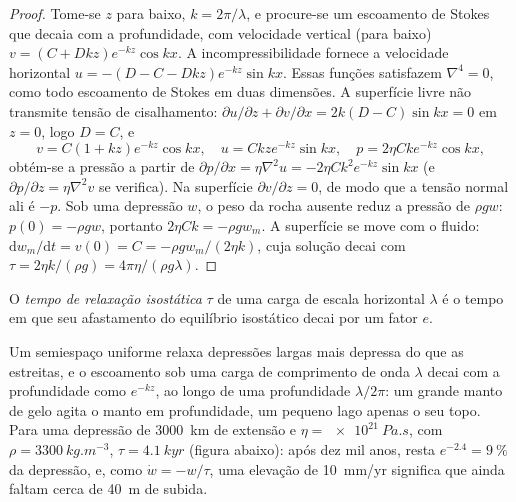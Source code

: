 \begin{proof}
Tome-se $z$ para baixo, $k = 2\pi/\lambda$, e procure-se um escoamento de Stokes que decaia
com a profundidade, com velocidade vertical (para baixo) $v = (C + Dkz)e^{-kz}\cos kx$.
A incompressibilidade fornece a velocidade horizontal $u = -(D - C - Dkz)e^{-kz}\sin
kx$. Essas funções satisfazem $\nabla^4 = 0$, como todo escoamento de Stokes em duas
dimensões. A superfície livre não transmite tensão de cisalhamento: $\partial u/\partial
z + \partial v/\partial x = 2k(D - C)\sin kx = 0$ em $z = 0$, logo $D = C$, e
\[
  v = C(1 + kz)e^{-kz}\cos kx,\quad u = Ckze^{-kz}\sin kx,\quad
  p = 2\eta Cke^{-kz}\cos kx,
\]
obtém-se a pressão a partir de $\partial p/\partial x = \eta\nabla^2u = -2\eta
Ck^2e^{-kz}\sin kx$ (e $\partial p/\partial z = \eta\nabla^2v$ se verifica). Na
superfície $\partial v/\partial z = 0$, de modo que a tensão normal ali é $-p$. Sob
uma depressão $w$, o peso da rocha ausente reduz a pressão de $\rho
gw$: $p(0) = -\rho gw$, portanto $2\eta Ck = -\rho gw_m$. A superfície se move com o
fluido: $\mathrm dw_m/\mathrm dt = v(0) = C = -\rho gw_m/(2\eta k)$, cuja
solução decai com $\tau = 2\eta k/(\rho g) = 4\pi\eta/(\rho g\lambda)$.
\end{proof}

\begin{definition}\label{def:b3:mantle-convection:relaxation-time}
O \emph{tempo de relaxação isostática} $\tau$ de
uma carga de escala horizontal $\lambda$ é o tempo em que seu afastamento do
equilíbrio isostático decai por um fator $e$.
\end{definition}

Um semiespaço uniforme relaxa depressões largas mais depressa do que as estreitas, e o
escoamento sob uma carga de comprimento de onda $\lambda$ decai com a profundidade como $e^{-kz}$, ao longo de
uma profundidade $\lambda/2\pi$: um grande manto de gelo agita o manto em profundidade, um pequeno lago
apenas o seu topo. Para uma depressão de \qty{3000}{km} de extensão e $\eta =
\qty{e21}{Pa.s}$, com $\rho = \qty{3300}{kg.m^{-3}}$, $\tau = \qty{4.1}{kyr}$
(figura abaixo): após dez mil anos, resta $e^{-2.4} = \qty{9}{\percent}$ da
depressão, e, como $\dot w = -w/\tau$, uma elevação de
\qty{10}{mm/yr} significa que ainda faltam cerca de \qty{40}{m} de subida.

